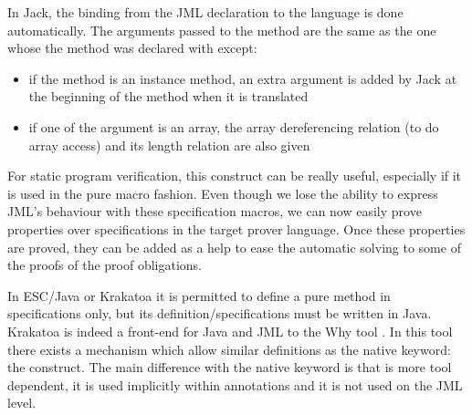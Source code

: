 In Jack, the binding from the JML declaration to the  
language is done automatically.
The arguments passed to the method are the same as the one whose the method 
was declared with except:
\begin{itemize}
\item if the method is an instance method, an extra argument  
is added by Jack 
  at the beginning of the method when it is translated
\item if one of the argument is an array, the array dereferencing relation
(to do array access) and its length relation are also given
\end{itemize}


For static program verification, this construct can be really useful, 
especially if it is used in the pure macro fashion. 
Even though we lose the ability to express JML's behaviour
with these specification macros, 
we can now easily prove properties over specifications in the target 
prover language. 
Once these properties are proved, they can be added as a help
to ease the automatic solving to some of the proofs of the proof obligations.

In  ESC/Java or Krakatoa it is permitted to define a pure method in
specifications only, but its definition/specifications must be written in Java.
Krakatoa is indeed a front-end for Java and JML to the Why tool 
\cite{Why-Tool}. 
In this tool there exists a mechanism 
which allow similar definitions as the native keyword: the 
 construct.
The main difference with the native keyword is that  
is more tool dependent, 
 it is used implicitly within annotations and it is not used on the JML level.


